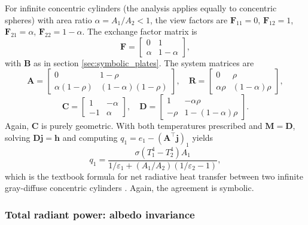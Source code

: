 \documentclass[preprint,1p,times]{elsarticle}
\theoremstyle{plain}
\theoremstyle{definition}
\theoremstyle{remark}
\begin{document}
For infinite concentric cylinders (the analysis applies equally to concentric spheres) with area ratio $\alpha = A_1/A_2 < 1$, the view factors are $\mathbf{F}_{11} = 0$, $\mathbf{F}_{12} = 1$, $\mathbf{F}_{21} = \alpha$, $\mathbf{F}_{22} = 1-\alpha$. The exchange factor matrix is
\begin{equation}
\mathbf{F} = \begin{bmatrix} 0 & 1 \\ \alpha & 1-\alpha \end{bmatrix},
\end{equation}
with $\mathbf{B}$ as in section \ref{sec:symbolic_plates}. The system matrices are
\begin{equation}
\mathbf{A} = \begin{bmatrix} 0 & 1-\rho \\ \alpha(1-\rho) & (1-\alpha)(1-\rho) \end{bmatrix},
\quad
\mathbf{R} = \begin{bmatrix} 0 & \rho \\ \alpha\rho & (1-\alpha)\rho \end{bmatrix},
\end{equation}
\begin{equation}
\mathbf{C} = \begin{bmatrix} 1 & -\alpha \\ -1 & \alpha \end{bmatrix},
\quad
\mathbf{D} = \begin{bmatrix} 1 & -\alpha\rho \\ -\rho & 1-(1-\alpha)\rho \end{bmatrix}.
\end{equation}
Again, $\mathbf{C}$ is purely geometric. With both temperatures prescribed and $\mathbf{M} = \mathbf{D}$, solving $\mathbf{D}\mathbf{j} = \mathbf{h}$ and computing $q_1 = e_1 - (\mathbf{A}^\top\mathbf{j})_1$ yields
\begin{equation}
q_1 = \frac{\sigma(T_1^4 - T_2^4) A_1}{1/\varepsilon_1 + (A_1/A_2)(1/\varepsilon_2 - 1)},
\label{eq:cylinders_textbook}
\end{equation}
which is the textbook formula for net radiative heat transfer between two infinite gray-diffuse concentric cylinders \citep{Daun2021}. Again, the agreement is symbolic.

\subsubsection{Total radiant power: albedo invariance}
\label{sec:radiant_power_albedo}
\end{document}

